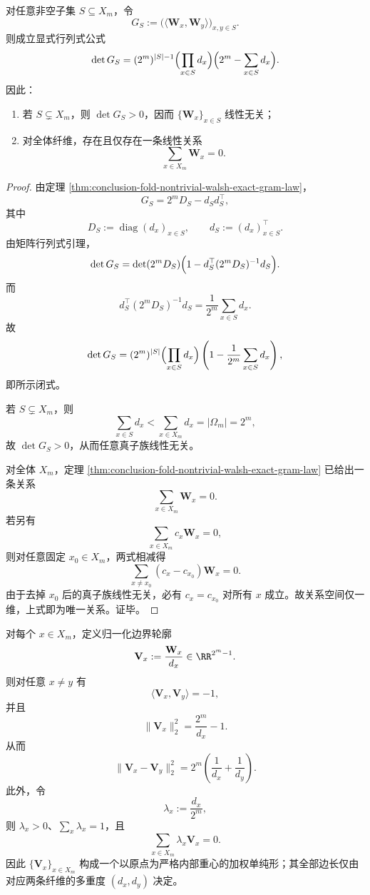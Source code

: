 \begin{proposition}[主子式闭式与唯一线性关系]\label{prop:conclusion-fold-walsh-principal-minors-unique-relation}
对任意非空子集 \(S\subseteq X_m\)，令
\[
G_S:=\bigl(\langle \mathbf W_x,\mathbf W_y\rangle\bigr)_{x,y\in S}.
\]
则成立显式行列式公式
\[
\det G_S
=
(2^m)^{|S|-1}\Bigl(\prod_{x\in S}d_x\Bigr)\Bigl(2^m-\sum_{x\in S}d_x\Bigr).
\]
因此：
\begin{enumerate}
  \item 若 \(S\subsetneq X_m\)，则 \(\det G_S>0\)，因而 \(\{\mathbf W_x\}_{x\in S}\) 线性无关；
  \item 对全体纤维，存在且仅存在一条线性关系
  \[
  \sum_{x\in X_m}\mathbf W_x=0.
  \]
\end{enumerate}
\end{proposition}

\begin{proof}
由定理 \ref{thm:conclusion-fold-nontrivial-walsh-exact-gram-law}，
\[
G_S=2^mD_S-d_Sd_S^\top,
\]
其中
\[
D_S:=\operatorname{diag}(d_x)_{x\in S},
\qquad
d_S:=(d_x)_{x\in S}^\top.
\]
由矩阵行列式引理，
\[
\det G_S
=
\det(2^mD_S)\Bigl(1-d_S^\top(2^mD_S)^{-1}d_S\Bigr).
\]
而
\[
d_S^\top(2^mD_S)^{-1}d_S
=
\frac{1}{2^m}\sum_{x\in S}d_x.
\]
故
\[
\det G_S
=
(2^m)^{|S|}\Bigl(\prod_{x\in S}d_x\Bigr)
\left(1-\frac{1}{2^m}\sum_{x\in S}d_x\right),
\]
即所示闭式。

若 \(S\subsetneq X_m\)，则
\[
\sum_{x\in S}d_x
<
\sum_{x\in X_m}d_x
=
|\Omega_m|
=
2^m,
\]
故 \(\det G_S>0\)，从而任意真子族线性无关。

对全体 \(X_m\)，定理 \ref{thm:conclusion-fold-nontrivial-walsh-exact-gram-law} 已给出一条关系
\[
\sum_{x\in X_m}\mathbf W_x=0.
\]
若另有
\[
\sum_{x\in X_m}c_x\mathbf W_x=0,
\]
则对任意固定 \(x_0\in X_m\)，两式相减得
\[
\sum_{x\neq x_0}(c_x-c_{x_0})\mathbf W_x=0.
\]
由于去掉 \(x_0\) 后的真子族线性无关，必有 \(c_x=c_{x_0}\) 对所有 \(x\) 成立。故关系空间仅一维，上式即为唯一关系。证毕。
\end{proof}

\begin{theorem}\label{thm:conclusion-fold-normalized-walsh-weighted-simplex-geometry}
对每个 \(x\in X_m\)，定义归一化边界轮廓
\[
\mathbf V_x:=\frac{\mathbf W_x}{d_x}\in\RR^{2^m-1}.
\]
则对任意 \(x\neq y\) 有
\[
\langle \mathbf V_x,\mathbf V_y\rangle=-1,
\]
并且
\[
\|\mathbf V_x\|_2^2=\frac{2^m}{d_x}-1.
\]
从而
\[
\|\mathbf V_x-\mathbf V_y\|_2^2
=
2^m\left(\frac{1}{d_x}+\frac{1}{d_y}\right).
\]
此外，令
\[
\lambda_x:=\frac{d_x}{2^m},
\]
则 \(\lambda_x>0\)、\(\sum_x\lambda_x=1\)，且
\[
\sum_{x\in X_m}\lambda_x\mathbf V_x=0.
\]
因此 \(\{\mathbf V_x\}_{x\in X_m}\) 构成一个以原点为严格内部重心的加权单纯形；其全部边长仅由对应两条纤维的多重度 \((d_x,d_y)\) 决定。
\end{theorem}

